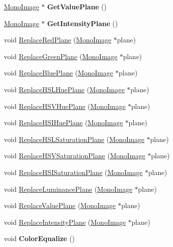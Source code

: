 \begin{DoxyCompactItemize}
\item 
\hypertarget{classColorImage_a6e3343f0ee935e4f886cefdc88ca630d}{
\hyperlink{classMonoImage}{MonoImage} $\ast$ {\bfseries GetValuePlane} ()}
\label{classColorImage_a6e3343f0ee935e4f886cefdc88ca630d}

\item 
\hypertarget{classColorImage_a807bce226f6c3aa5c8a93fb5529076e5}{
\hyperlink{classMonoImage}{MonoImage} $\ast$ {\bfseries GetIntensityPlane} ()}
\label{classColorImage_a807bce226f6c3aa5c8a93fb5529076e5}

\item 
void \hyperlink{classColorImage_a55052912bd0ffdc235f58716da9f61b1}{ReplaceRedPlane} (\hyperlink{classMonoImage}{MonoImage} $\ast$plane)
\item 
void \hyperlink{classColorImage_a1f4101a81cc10874824cf1ab015a4075}{ReplaceGreenPlane} (\hyperlink{classMonoImage}{MonoImage} $\ast$plane)
\item 
void \hyperlink{classColorImage_a27b3fefaf49e394cb2b2c55dbeb3bc4c}{ReplaceBluePlane} (\hyperlink{classMonoImage}{MonoImage} $\ast$plane)
\item 
void \hyperlink{classColorImage_a1ec3310a38bfc9c154867bdb96d17c6c}{ReplaceHSLHuePlane} (\hyperlink{classMonoImage}{MonoImage} $\ast$plane)
\item 
void \hyperlink{classColorImage_a1ca28fb183bf9b43e53aa19d6a057e05}{ReplaceHSVHuePlane} (\hyperlink{classMonoImage}{MonoImage} $\ast$plane)
\item 
void \hyperlink{classColorImage_af7ebf5ca05ea094f0a5d2f458d9e77a4}{ReplaceHSIHuePlane} (\hyperlink{classMonoImage}{MonoImage} $\ast$plane)
\item 
void \hyperlink{classColorImage_a78ac142deade419e4976aef3e7f416fa}{ReplaceHSLSaturationPlane} (\hyperlink{classMonoImage}{MonoImage} $\ast$plane)
\item 
void \hyperlink{classColorImage_aae250be4d72a84126d4824654f1f229c}{ReplaceHSVSaturationPlane} (\hyperlink{classMonoImage}{MonoImage} $\ast$plane)
\item 
void \hyperlink{classColorImage_a02c2a04b2f69525d53aa5abfec04577d}{ReplaceHSISaturationPlane} (\hyperlink{classMonoImage}{MonoImage} $\ast$plane)
\item 
void \hyperlink{classColorImage_aaf1efe726cc254fe848bd8586a30a556}{ReplaceLuminancePlane} (\hyperlink{classMonoImage}{MonoImage} $\ast$plane)
\item 
void \hyperlink{classColorImage_ac1b98c5f7d2854e5b6c9d1582da935b0}{ReplaceValuePlane} (\hyperlink{classMonoImage}{MonoImage} $\ast$plane)
\item 
void \hyperlink{classColorImage_a6ea360d276e60f3df6f494ef9b5031c8}{ReplaceIntensityPlane} (\hyperlink{classMonoImage}{MonoImage} $\ast$plane)
\item 
\hypertarget{classColorImage_afac91d2ea99088e36672cfffe02b65da}{
void {\bfseries ColorEqualize} ()}
\label{classColorImage_afac91d2ea99088e36672cfffe02b65da}


\end{DoxyCompactItemize}
